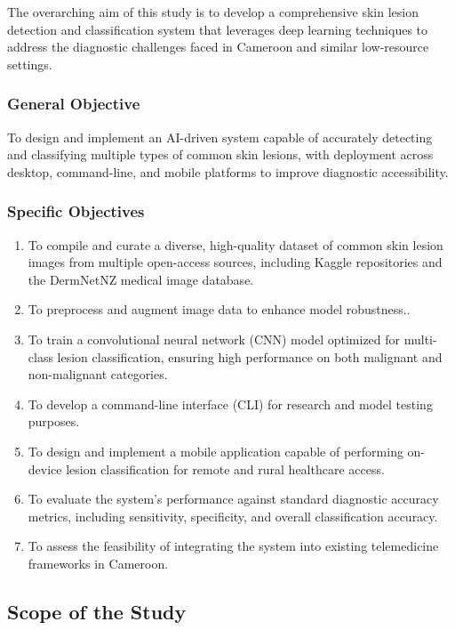 \documentclass[
  12pt,
  oneside]{article}
\begin{document}
The overarching aim of this study is to develop a comprehensive skin
lesion detection and classification system that leverages deep learning
techniques to address the diagnostic challenges faced in Cameroon and
similar low-resource settings.

\subsubsection{General Objective}\label{general-objective}

To design and implement an AI-driven system capable of accurately
detecting and classifying multiple types of common skin lesions, with
deployment across desktop, command-line, and mobile platforms to improve
diagnostic accessibility.

\subsubsection{Specific Objectives}\label{specific-objectives}

\begin{enumerate}
    \item To compile and curate a diverse, high-quality dataset of common skin lesion images from multiple open-access sources, including Kaggle repositories and the DermNetNZ medical image database.
    \item To preprocess and augment image data to enhance model robustness..
    \item To train a convolutional neural network (CNN) model optimized for multi-class lesion classification, ensuring high performance on both malignant and non-malignant categories.
    \item To develop a command-line interface (CLI) for research and model testing purposes.
    \item To design and implement a mobile application capable of performing on-device lesion classification for remote and rural healthcare access.
    \item To evaluate the system's performance against standard diagnostic accuracy metrics, including sensitivity, specificity, and overall classification accuracy.
    \item To assess the feasibility of integrating the system into existing telemedicine frameworks in Cameroon.
\end{enumerate}

\subsection{Scope of the Study}\label{scope-of-the-study}
\end{document}
